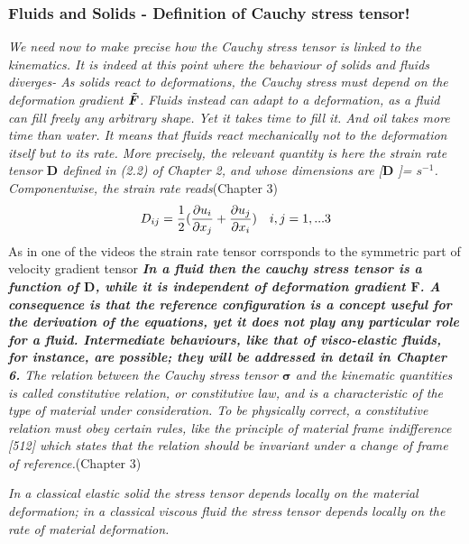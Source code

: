 \documentclass[11pt,letterpaper]{article}
\begin{document}
\subsubsection*{Fluids and Solids - Definition of Cauchy stress tensor!} \textit{We need now to make precise how the Cauchy stress tensor is linked to the kinematics. It is indeed at this point where the behaviour of solids and fluids diverges- As solids react to deformations, the Cauchy stress must depend on the deformation gradient $\bm{\Tilde{F}}$. 
Fluids instead can adapt to a deformation, as a fluid can fill freely any
arbitrary shape. Yet it takes time to fill it. And oil takes more time than water. It means that fluids react mechanically not to the deformation itself but to its rate. More precisely, the relevant quantity is here the strain rate tensor $\bm{D}$ defined in (2.2) of Chapter 2, and whose dimensions are [$\bm{D}$ ]= $s^{-1}$. Componentwise, the strain rate reads}(Chapter 3) 
\begin{equation}
    D_{ij} = \frac{1}{2} \large( \frac{\partial u_i}{\partial x_j} + \frac{\partial u_j}{\partial x_i} \large) \hspace{10pt} i,j=1,...3
\end{equation}
As in one of the videos the strain rate tensor corrsponds to the symmetric part of velocity gradient tensor
\textit{\textbf{In a fluid then  the cauchy stress tensor is a function of $\bm{D}$, while it is independent of  deformation gradient $\bm{F}$. A consequence is that the reference configuration is a concept useful for the derivation of the equations, yet it does not play any particular role for a fluid. Intermediate behaviours, like that of visco-elastic fluids, for instance, are possible; they will be addressed in detail in Chapter 6.} The relation between the Cauchy stress tensor $\bm{\sigma}$ and the kinematic quantities is called constitutive relation, or constitutive law, and is a characteristic of the type of material under consideration. To be physically correct, a constitutive relation must obey certain rules, like the principle of material frame indifference [512] which states that the relation should be invariant under a change of frame of reference.}(Chapter 3)


\textit{ In a classical elastic
solid the stress tensor depends locally on the material deformation; in a classical
viscous fluid the stress tensor depends locally on the rate of material deformation.\cite{Morozov2015_nonnewtonian}}
\end{document}
